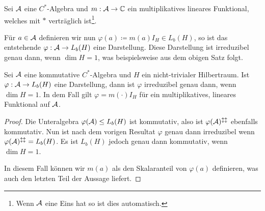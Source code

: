 \begin{example}
    Sei $\mathcal{A}$ eine $C^*$-Algebra und $m : \mathcal{A} \to \mathbb{C}$ ein multiplikatives lineares Funktional, welches mit $\ast$ verträglich ist\footnote{Wenn $\mathcal{A}$ eine Eins hat so ist dies automatisch.}.

    Für $a \in \mathcal{A}$ definieren wir nun $\varphi(a) \coloneqq m(a) I_H \in L_b(H)$, so ist das entstehende $\varphi : \mathcal{A} \to L_b(H)$ eine Darstellung. Diese Darstellung ist irreduzibel genau dann, wenn $\dim H = 1$, was beispielsweise aus dem obigen Satz folgt.
\end{example}

\begin{corollary}
    Sei $\mathcal{A}$ eine kommutative $C^*$-Algebra und $H$ ein nicht-trivialer Hilbertraum. Ist $\varphi : \mathcal{A} \to L_b(H)$ eine Darstellung, dann ist $\varphi$ irreduzibel genau dann, wenn $\dim H = 1$. In dem Fall gilt $\varphi = m(\cdot) I_H$ für ein multiplikatives, lineares Funktional auf $\mathcal{A}$.
\end{corollary}

\begin{proof}
    Die Unteralgebra $\varphi(\mathcal{A}) \leq L_b(H)$ ist kommutativ, also ist $\varphi(\mathcal{A})^{\updownarrow\updownarrow}$ ebenfalls kommutativ. Nun ist nach dem vorigen Resultat $\varphi$ genau dann irreduzibel wenn $\varphi(\mathcal{A})^{\updownarrow\updownarrow} = L_b(H)$. Es ist $L_b(H)$ jedoch genau dann kommutativ, wenn $\dim H = 1$.

    In diesem Fall können wir $m(a)$ als den Skalaranteil von $\varphi(a)$ definieren, was auch den letzten Teil der Aussage liefert.
\end{proof}